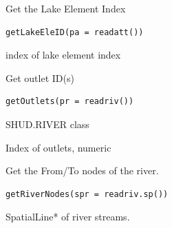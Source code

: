\documentclass[a4paper]{book}
\begin{document}
%
\begin{Description}\relax
Get the Lake Element Index
\end{Description}
%
\begin{Usage}
\begin{verbatim}
getLakeEleID(pa = readatt())
\end{verbatim}
\end{Usage}
%
\begin{Arguments}
\begin{ldescription}
\item[\code{pa}] 
\end{ldescription}
\end{Arguments}
%
\begin{Value}
index of lake element index
\end{Value}
%
\begin{Description}\relax
Get outlet ID(s)
\end{Description}
%
\begin{Usage}
\begin{verbatim}
getOutlets(pr = readriv())
\end{verbatim}
\end{Usage}
%
\begin{Arguments}
\begin{ldescription}
\item[\code{pr}] SHUD.RIVER class
\end{ldescription}
\end{Arguments}
%
\begin{Value}
Index of outlets, numeric
\end{Value}
%
\begin{Description}\relax
Get the From/To nodes of the river.
\end{Description}
%
\begin{Usage}
\begin{verbatim}
getRiverNodes(spr = readriv.sp())
\end{verbatim}
\end{Usage}
%
\begin{Arguments}
\begin{ldescription}
\item[\code{spr}] SpatialLine* of river streams.
\end{ldescription}
\end{Arguments}
\end{document}
